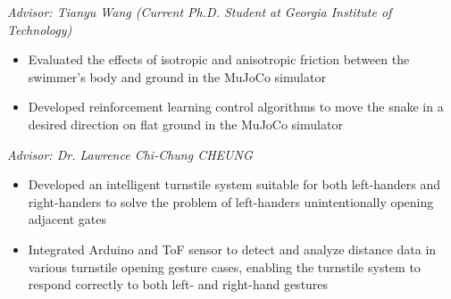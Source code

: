 \textit{Advisor: Tianyu Wang (Current Ph.D. Student at Georgia Institute of Technology)}\par
\begin{itemize}
  \item Evaluated the effects of isotropic and anisotropic friction between the swimmer’s body and ground in the MuJoCo simulator
  \item Developed reinforcement learning control algorithms to move the snake in a desired direction on flat ground in the MuJoCo simulator
\end{itemize}

\cventryspace
{}
\textit{Advisor: Dr. Lawrence Chi-Chung CHEUNG}\par
{}
\begin{itemize}
  \item Developed an intelligent turnstile system suitable for both left-handers and right-handers to solve the problem of left-handers unintentionally opening adjacent gates
  \item Integrated Arduino and ToF sensor to detect and analyze distance data in various turnstile opening gesture cases, enabling the turnstile system to respond correctly to both left- and right-hand gestures
\end{itemize}
